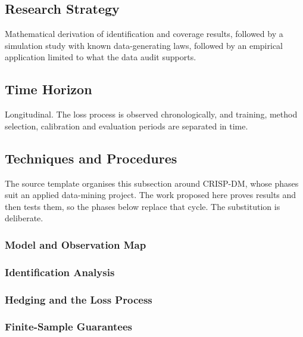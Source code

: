 \documentclass[12pt,final]{article}
\begin{document}
	\subsection{Research Strategy}
	Mathematical derivation of identification and coverage results, followed by
	a simulation study with known data-generating laws, followed by an empirical
	application limited to what the data audit supports.

	\subsection{Time Horizon}
	Longitudinal. The loss process is observed chronologically, and training,
	method selection, calibration and evaluation periods are separated in time.

	\subsection{Techniques and Procedures}

	The source template organises this subsection around CRISP-DM, whose phases
	suit an applied data-mining project. The work proposed here proves results
	and then tests them, so the phases below replace that cycle. The substitution
	is deliberate.

	\subsubsection{Model and Observation Map}

	\subsubsection{Identification Analysis}

	\subsubsection{Hedging and the Loss Process}

	\subsubsection{Finite-Sample Guarantees}
\end{document}
